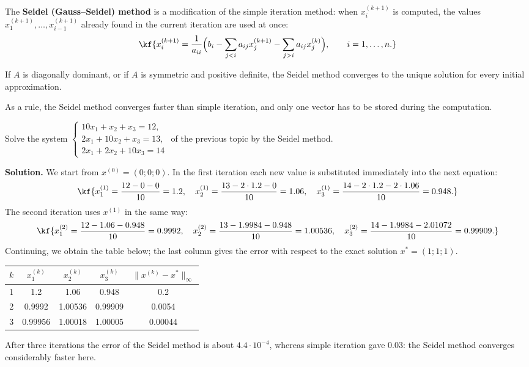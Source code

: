 
\begin{tarif}
The \textbf{Seidel (Gauss–Seidel) method} is a modification of the simple
iteration method: when $x_i^{(k+1)}$ is computed, the values
$x_1^{(k+1)},\dots,x_{i-1}^{(k+1)}$ already found in the current iteration are
used at once:
\[\kf{x_i^{(k+1)}=\frac{1}{a_{ii}}\Big(b_i-\sum\limits_{j<i}a_{ij}x_j^{(k+1)}-\sum\limits_{j>i}a_{ij}x_j^{(k)}\Big),
\qquad i=1,\dots,n .}\]
\end{tarif}

\begin{teorema}
If $A$ is diagonally dominant, or if $A$ is symmetric and positive definite,
the Seidel method converges to the unique solution for every initial
approximation.
\end{teorema}

As a rule, the Seidel method converges faster than simple iteration, and
only one vector has to be stored during the computation.

\begin{misol}
Solve the system
$\begin{cases}10x_1+x_2+x_3=12,\\2x_1+10x_2+x_3=13,\\2x_1+2x_2+10x_3=14\end{cases}$
of the previous topic by the Seidel method.

\textbf{Solution.} We start from $x^{(0)}=(0;0;0)$. In the first iteration
each new value is substituted immediately into the next equation:
\[\kf{x_1^{(1)}=\frac{12-0-0}{10}=1.2,\quad
x_2^{(1)}=\frac{13-2\cdot1.2-0}{10}=1.06,\quad
x_3^{(1)}=\frac{14-2\cdot1.2-2\cdot1.06}{10}=0.948 .}\]
The second iteration uses $x^{(1)}$ in the same way:
\[\kf{x_1^{(2)}=\frac{12-1.06-0.948}{10}=0.9992,\quad
x_2^{(2)}=\frac{13-1.9984-0.948}{10}=1.00536,\quad
x_3^{(2)}=\frac{14-1.9984-2.01072}{10}=0.99909 .}\]
Continuing, we obtain the table below; the last column gives the error with
respect to the exact solution $x^*=(1;1;1)$.

\begin{center}
\begin{tabular}{c|ccc|c}
$k$ & $x_1^{(k)}$ & $x_2^{(k)}$ & $x_3^{(k)}$ & $\|x^{(k)}-x^*\|_\infty$\\ \hline
1 & 1.2 & 1.06 & 0.948 & 0.2\\
2 & 0.9992 & 1.00536 & 0.99909 & 0.0054\\
3 & 0.99956 & 1.00018 & 1.00005 & 0.00044\\
\end{tabular}
\end{center}
After three iterations the error of the Seidel method is about
$4.4\cdot10^{-4}$, whereas simple iteration gave $0.03$: the Seidel method
converges considerably faster here.
\end{misol}

